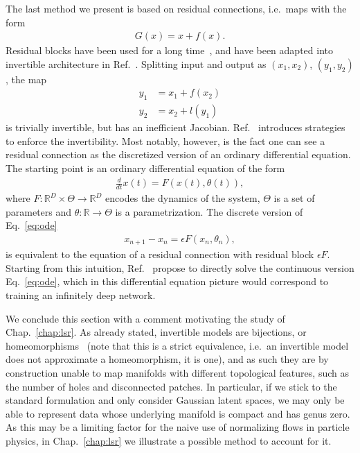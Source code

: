 The last method we present is based on residual connections, i.e.\  maps with the form
%
\begin{align}
G(x) = x + f(x).
\end{align}
%
Residual blocks have been used for a long time~\cite{he2015deep}, and have been adapted into invertible architecture in Ref.~\cite{gomez2017reversible, jacobsen2018irevnet}. Splitting input and output as $(x_1, x_2)$, $(y_1, y_2)$, the map
%
\begin{align}
y_1 &= x_1 + f(x_2)\\
y_2 &= x_2 + l(y_1)
\end{align}
%
is trivially invertible, but has an inefficient Jacobian. Ref.~\cite{gomez2017reversible, jacobsen2018irevnet} introduces
strategies to enforce the invertibility.
Most notably, however, is the fact one can see a residual connection as the discretized 
version of an ordinary differential equation. 
The starting point is an ordinary differential equation of the form
%
\begin{align}\label{eq:ode}
\frac{d}{dt}x(t) = F(x(t), \theta(t)),
\end{align}
%
where $F : \mathbb{R}^D \times \Theta \rightarrow \mathbb{R}^D$ encodes the dynamics of the system, $\Theta$ is a set of parameters and $\theta : \mathbb{R} \rightarrow \Theta$ is a parametrization.
The discrete version of Eq.~\ref{eq:ode} 
%
\begin{align}
x_{n+1} - x_n = \epsilon F(x_n, \theta_n), 
\end{align}
%
is equivalent to the equation of a residual connection with residual block $\epsilon F$.
Starting from this intuition, Ref.~\cite{dupont2019augmented, chen2019neural , grathwohl2018ffjord} 
propose to directly solve the continuous version Eq.~\ref{eq:ode}, which in this differential equation picture 
would correspond to training an infinitely deep network.

\medskip

We conclude this section with a comment motivating the study of Chap.~\ref{chap:lsr}. As already stated, invertible models are bijections, or homeomorphisms~\cite{dupont2019augmented,  huang2020augmented} (note that this is a strict equivalence, i.e.\   an invertible model does not approximate a homeomorphism, it is one), and as such they are by construction unable to map manifolds with different topological features, such as the number of holes and disconnected patches. In particular, if we stick to the standard formulation and only consider Gaussian latent spaces, we may only be able to represent data whose underlying manifold is compact and has genus zero. As this may be a limiting factor for the naive use of normalizing flows in particle physics, in Chap.~\ref{chap:lsr} we illustrate a possible method to account for it.

